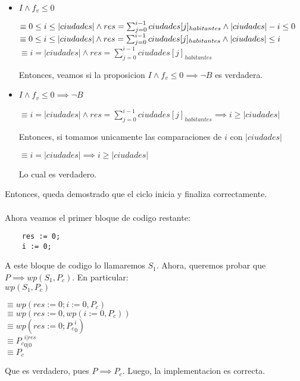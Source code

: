 \documentclass[10pt,a4paper]{article}
\begin{document}
\begin{itemize}
	\item $I \wedge f_v \leq 0$
	      \begin{adjustwidth}{2em}{}
		      $\equiv 0 \leq i \leq |ciudades| \wedge res = \sum_{j=0}^{i-1} ciudades[j]_{habitantes} \wedge |ciudades| - i \leq 0 \newline$
		      $\equiv 0 \leq i \leq |ciudades| \wedge res = \sum_{j=0}^{i-1} ciudades[j]_{habitantes} \wedge |ciudades| \leq i \newline$
		      $\equiv i = |ciudades| \wedge res = \sum_{j=0}^{i-1}ciudades[j]_{habitantes}$
	      \end{adjustwidth}
	      Entonces, veamos si la proposicion $I \wedge f_v \leq 0 \implies \neg B$ es verdadera.\newline
	\item $I \wedge f_v \leq 0 \implies \neg B$
	      \begin{adjustwidth}{2em}{}
		      $\equiv i = |ciudades| \wedge res = \sum_{j=0}^{i-1}ciudades[j]_{habitantes} \implies i \geq |ciudades|$
	      \end{adjustwidth}
	      Entonces, si tomamos unicamente las comparaciones de $i$ con $|ciudades|$
	      \begin{adjustwidth}{2em}{}
		      $ \equiv i = |ciudades| \implies i \geq |ciudades|$
	      \end{adjustwidth}
	      Lo cual es verdadero. 
\end{itemize}
Entonces, queda demostrado que el ciclo inicia y finaliza correctamente.\\\\
Ahora veamos el primer bloque de codigo restante:
\begin{lstlisting}
	res := 0;
	i := 0;
\end{lstlisting}
A este bloque de codigo lo llamaremos $S_1$. Ahora, queremos probar que $P \implies wp(S_1, P_c)$. En particular:
\\ $wp(S_1,P_c)$
\begin{adjustwidth}{2em}{}
	$\equiv wp(res := 0; i :=0 , P_c)$\\
	$\equiv wp(res := 0, wp(i := 0, P_c))$\\
	$\equiv wp(res := 0; {P_c}_0^i )$\\
	$\equiv {P_c}_{0|0}^{i|res}$\\
	$\equiv P_c$
\end{adjustwidth}
Que es verdadero, pues $P \implies P_c$.
Luego, la implementacion es correcta.
\end{document}
